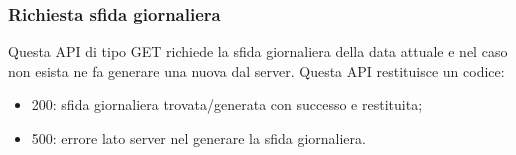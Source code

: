 \subsubsection{Richiesta sfida giornaliera}
Questa API di tipo GET richiede la sfida giornaliera della data attuale e nel caso non esista ne fa generare una nuova dal server.
Questa API restituisce un codice:
\begin{itemize}
    \item 200: sfida giornaliera trovata/generata con successo e restituita;
    \item 500: errore lato server nel generare la sfida giornaliera.
\end{itemize}






